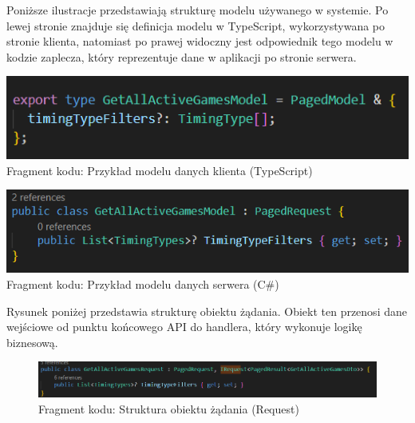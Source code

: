 \documentclass[12pt,a4paper]{article}
\begin{document}
\newpage

\noindent
Poniższe ilustracje przedstawiają strukturę modelu używanego w systemie. Po lewej stronie znajduje się definicja modelu w TypeScript, wykorzystywana po stronie klienta, natomiast po prawej widoczny jest odpowiednik tego modelu w kodzie zaplecza, który reprezentuje dane w aplikacji po stronie serwera.

\vspace{1cm}
\begin{minipage}[t]{0.45\textwidth} 
    \vspace{0pt} 
    \centering 
    \includegraphics[width=\linewidth]{images/ex_model_front.png} 
    Fragment kodu: Przykład modelu danych klienta (TypeScript)
\end{minipage} 
\hfill 
\begin{minipage}[t]{0.45\textwidth} 
    \vspace{0pt} 
    \centering 
    \includegraphics[width=\linewidth]{images/ex_model_back.png} 
    Fragment kodu: Przykład modelu danych serwera (C\#)
\end{minipage} 
\vspace{1cm}

\noindent
Rysunek poniżej przedstawia strukturę obiektu żądania. Obiekt ten przenosi dane wejściowe od punktu końcowego API do handlera, który wykonuje logikę biznesową.

\vspace{1cm}
\begin{figure}[h!]
    \centering
    \includegraphics[width=1\textwidth]{images/ex_request_back.png}
    \caption{Fragment kodu: Struktura obiektu żądania (Request)}
\end{figure}
\vspace{1cm}
\end{document}
